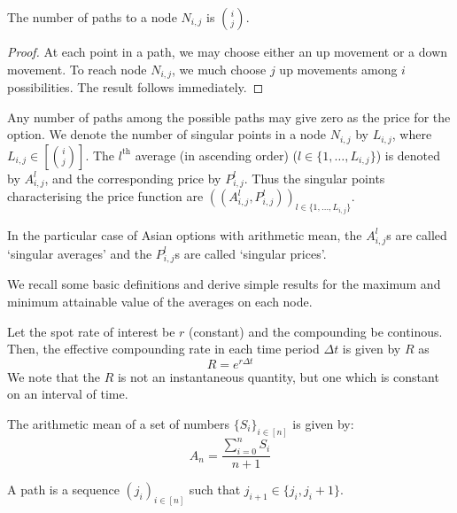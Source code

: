 \begin{prp}
	The number of paths to a node $ N_{i,j} $ is $ \binom{i}{j} $.
\end{prp}

\begin{proof}
	At each point in a path, we may choose either an up movement or a down movement. To reach node $ N_{i,j} $, we much choose $j$ up movements among $i$ possibilities. The result follows immediately.
\end{proof}


Any number of paths among the possible paths may give zero as the price for the option. We denote the number of singular points in a node $ N_{i,j} $ by $ L_{i,j} $, where $ L_{i,j} \in \left[ \binom{i}{j} \right] $. The $ l^\mathrm{th} $ average (in ascending order) ($ l \in \{ 1, \dots, L_{i,j} \} $) is denoted by $ A_{i,j}^l $, and the corresponding price by $ P_{i,j}^l $. Thus the singular points characterising the price function are $ ( ( A_{i,j}^l, P_{i,j}^l ) )_{l \in \{ 1, \dots, L_{i,j} \} } $.

\begin{dfn}
	In the particular case of Asian options with arithmetic mean, the $ A_{i,j}^l $s are called `singular averages' and the $ P_{i,j}^l $s are called `singular prices'.
\end{dfn}


We recall some basic definitions and derive simple results for the maximum and minimum attainable value of the averages on each node.

Let the spot rate of interest be $r$ (constant) and the compounding be continous. Then, the effective compounding rate in each time period $\Delta t$ is given by $R$ as
\begin{equation}
	\label{eq:R}
	R = e^{r \Delta t}
\end{equation}
We note that the $R$ is not an instantaneous quantity, but one which is constant on an interval of time.


\begin{dfn}
	The arithmetic mean of a set of numbers $ \{ S_i \}_{i \in [n]} $ is given by:
	\begin{equation}
		\label{eq:am}
		A_{n} = \frac{\sum_{i=0}^n S_i}{n+1}
	\end{equation}
\end{dfn}


\begin{dfn}[Path]
	A path is a sequence $(j_i)_{i \in [n]}$ such that $j_{i+1} \in \{ j_i,j_i+1 \}$.
\end{dfn}

